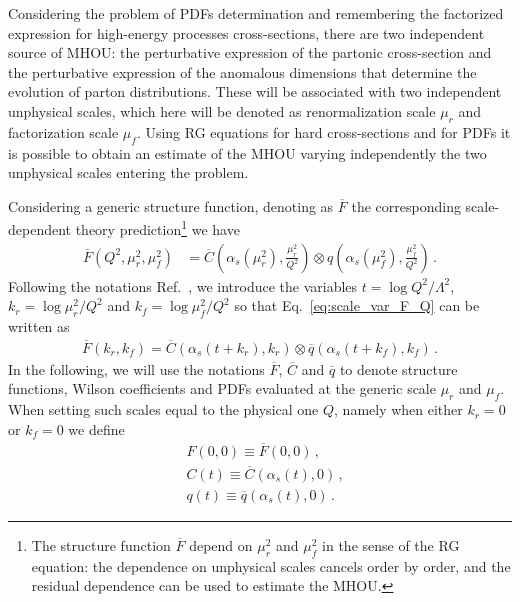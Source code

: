 %
Considering the problem of PDFs determination and remembering the factorized expression
for high-energy processes cross-sections, there are two independent source of MHOU: the 
perturbative expression of the partonic cross-section and the perturbative expression of the 
anomalous dimensions that determine the evolution of parton distributions.
These will be associated with two independent unphysical scales, which here will be denoted as renormalization scale
$\mu_r$ and factorization scale $\mu_f$.
Using RG equations for hard cross-sections and for PDFs it is possible to obtain an estimate of the MHOU
varying independently the two unphysical scales entering the problem.

Considering a generic structure function, 
denoting as $\overline{F}$ the corresponding scale-dependent theory prediction\footnote{The structure 
function $\overline{F}$ depend on $\mu_r^2$ and $\mu_f^2$ in the sense of the RG
equation: the dependence on unphysical scales cancels order by order, and the residual dependence can
be used to estimate the MHOU.}
we have 
\begin{align}
\label{eq:scale_var_F_Q}
    \overline{F}\left(Q^2,\mu_r^2, \mu_f^2\right) &= 
    \overline{C}\left(\alpha_s\left(\mu_r^2\right),\frac{\mu_r^2}{Q^2}\right)\otimes 
    q\left(\alpha_s\left(\mu_f^2\right),\frac{\mu_f^2}{Q^2}\right)\,. 
\end{align}
Following the notations Ref.~\cite{AbdulKhalek:2019ihb}, we introduce the variables
$t = \log Q^2/\Lambda^2$, $k_r = \log \mu_r^2/Q^2$ and $k_f = \log \mu_f^2/Q^2$ so that Eq.~\ref{eq:scale_var_F_Q}
can be written as 
\begin{align}
    \label{eq:scale_var_F}
    \overline{F}\left(k_r, k_f\right)=
    \overline{C}\left(\alpha_s\left(t+k_r\right),k_r\right)\otimes \overline{q}\left(\alpha_s\left(t+k_f\right),k_f\right)\,.
    \end{align}
In the following, we will use the notations $\overline{F}$, $\overline{C}$ and $\overline{q}$ to denote 
structure functions, Wilson coefficients and PDFs evaluated at the generic scale $\mu_r$ and $\mu_f$.
When setting such scales equal to the physical one $Q$, namely when either $k_r=0$ or $k_f=0$ we define
\begin{align}
    \label{eq:central_scale}
    &F\left(0,0\right) \equiv \overline{F}\left(0, 0\right)\,, \nonumber\\
    &C\left(t\right)   \equiv \overline{C}\left(\alpha_s\left(t\right),0\right)\,,\\
    &q\left(t\right)   \equiv \overline{q}\left(\alpha_s\left(t\right),0\right)\,. \nonumber
\end{align}

